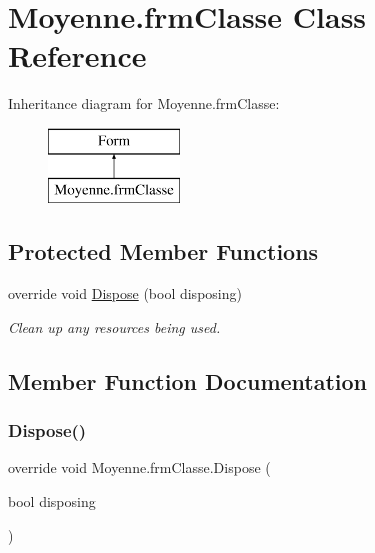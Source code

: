 \hypertarget{class_moyenne_1_1frm_classe}{}\section{Moyenne.\+frm\+Classe Class Reference}
\label{class_moyenne_1_1frm_classe}
Inheritance diagram for Moyenne.\+frm\+Classe\+:\begin{figure}[H]
\begin{center}
\leavevmode
\includegraphics[height=2.000000cm]{class_moyenne_1_1frm_classe}
\end{center}
\end{figure}
\subsection*{Protected Member Functions}
\begin{DoxyCompactItemize}
\item 
override void \hyperlink{class_moyenne_1_1frm_classe_ae7baf72f6e4d6fb0f6ad3e65b9a6c580}{Dispose} (bool disposing)
\begin{DoxyCompactList}\small\item\em Clean up any resources being used. \end{DoxyCompactList}\end{DoxyCompactItemize}


\subsection{Member Function Documentation}
\mbox{\label{class_moyenne_1_1frm_classe_ae7baf72f6e4d6fb0f6ad3e65b9a6c580}} 
\subsubsection{\texorpdfstring{Dispose()}{Dispose()}}
{\footnotesize\ttfamily override void Moyenne.\+frm\+Classe.\+Dispose (\begin{DoxyParamCaption}\item[{bool}]{disposing }\end{DoxyParamCaption})\hspace{0.3cm}{\ttfamily [protected]}}



